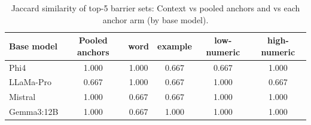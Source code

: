 \begin{table}[ht]
\centering
\caption{Jaccard similarity of top-5 barrier sets: Context vs pooled anchors and vs each anchor arm (by base model).}
\label{tab:jaccard_top5}
\begin{tabular}{lccccc}
\hline
Base model & Pooled anchors & word & example & low-numeric & high-numeric \\ \hline
Phi4 & 1.000 & 1.000 & 0.667 & 0.667 & 1.000 \\ 
LLaMa-Pro & 0.667 & 1.000 & 0.667 & 1.000 & 0.667 \\ 
Mistral & 1.000 & 0.667 & 0.667 & 1.000 & 1.000 \\ 
Gemma3:12B & 1.000 & 0.667 & 1.000 & 1.000 & 1.000 \\ \hline
\end{tabular}
\end{table}

